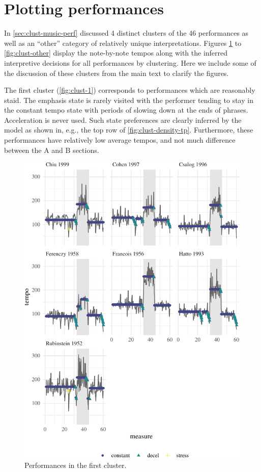 \documentclass[aoas]{aoas/imsart}
\begin{document}
\hypertarget{plotting-performances}{%
\section{Plotting performances}\label{plotting-performances}}

In \autoref{sec:clust-music-perf} discussed 4 distinct clusters of the
46 performances as well as an ``other'' category of relatively unique
interpretations. Figures \ref{fig:clust-1} to \ref{fig:clust-other}
display the note-by-note tempos along with the inferred interpretive
decisions for all performances by clustering. Here we include some of
the discussion of these clusters from the main text to clarify the
figures.

The first cluster (\autoref{fig:clust-1}) corresponds to performances
which are reasonably staid. The emphasis state is rarely visited with
the performer tending to stay in the constant tempo state with periods
of slowing down at the ends of phrases. Acceleration is never used. Such
state preferences are clearly inferred by the model as shown in, e.g.,
the top row of \autoref{fig:clust-density-tp}. Furthermore, these
performances have relatively low average tempos, and not much difference
between the A and B sections.

\begin{figure}

{\centering \includegraphics{gfx/clust-1-1} 

}

\caption{Performances in the first cluster.}\label{fig:clust-1}
\end{figure}
\end{document}
